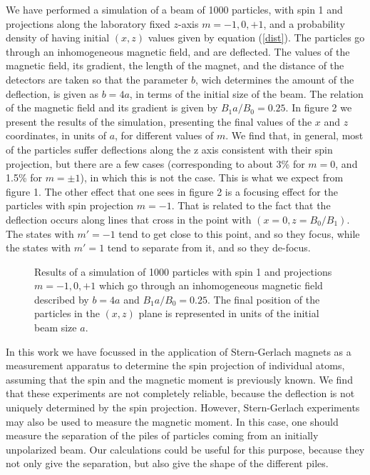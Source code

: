 \documentclass[aps,preprint,prl]{revtex4-2}
\begin{document}
We have performed a simulation of a beam of 1000
particles, with spin 1 and projections along the laboratory fixed $z$-axis 
$m=-1,0,+1$,
and  a  probability density of having initial $(x,z)$ values 
given by equation (\ref{dist}).  The particles go through  an inhomogeneous 
magnetic field, and are deflected. The values of the magnetic field, 
its gradient, the length of the magnet, and the distance of the detectors are
taken so that the parameter $b$, wich determines the amount of the deflection, 
is given as $b=4a$, in terms of the initial size of the beam. 
The relation of the
magnetic field and its gradient is given by $B_1a/B_0=0.25$.
In figure 2 we present the results of the simulation, presenting the final 
values of the $x$ and $z$ coordinates, in units of $a$, for different values 
of $m$. We find that, in general, most of the particles suffer deflections
along the z axis consistent with their spin projection, but there are a few
cases (corresponding to about 3\% for $m=0$, and 1.5\% for $m=\pm1$), in which
this is not the case. This is what we expect from figure 1. The other effect
that one sees in figure 2 is a focusing effect for the particles with spin
projection $m=-1$. That is related to the fact that the deflection occurs
along lines that cross in the point with $(x=0, z=B_0/B_1)$.  The states with
$m'=-1$ tend to get close to this point, and so they focus, while the states
with $m'=1$ tend to separate from it, and so they de-focus.
    
\begin{center}
\begin{figure}
\mbox{}
\caption{Results of a simulation of 1000 particles with spin 1 and projections
$m=-1,0,+1$ which go through an inhomogeneous magnetic field described by
$b=4a$ and $B_1a/B_0=0.25$. The final position of the particles in the $(x,z)$
plane is represented in units of the initial beam size $a$.}
\end{figure}
\end{center}

In this work we have focussed in the application of Stern-Gerlach magnets as
a measurement apparatus to determine the spin projection of individual atoms,
assuming that the spin and the magnetic moment is previously known. 
We find that these experiments are
not completely reliable, because the deflection is not uniquely determined by 
the spin projection. However, Stern-Gerlach experiments may also be used
to measure the magnetic moment. In this case, one should measure the separation
of the piles of particles coming from an initially unpolarized beam. 
Our calculations could be useful for this purpose, because they not only give
the separation, but also give the shape of the different piles. 
\end{document}
